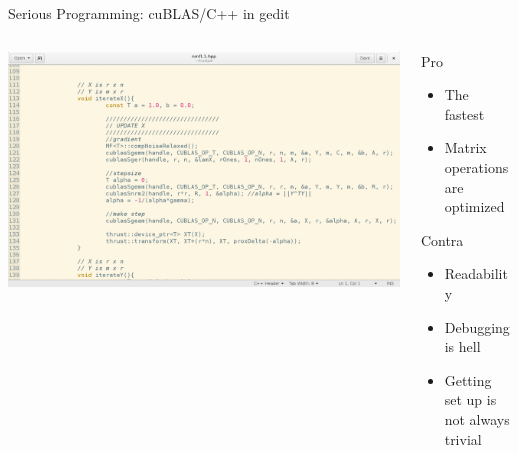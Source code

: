 \documentclass[aspectratio=169,10pt]{beamer}
\begin{document}
\begin{frame}[fragile]{Serious Programming: cuBLAS/C++ in gedit}
\begin{columns}
\begin{column}{0.7\textwidth}
\includegraphics[width=\textwidth]{img/sibyGeditC.png}
\end{column}
\begin{column}{0.25\textwidth}
\begin{alertblock}{Pro}
\begin{itemize}
    \item The fastest
    \item Matrix operations are optimized
\end{itemize}
\end{alertblock}
\begin{block}{Contra}
\begin{itemize}
    \item Readability
    \item Debugging is hell
    \item Getting set up is not always trivial
\end{itemize}
\end{block}
\end{column}
\end{columns}
\end{frame}
\end{document}
